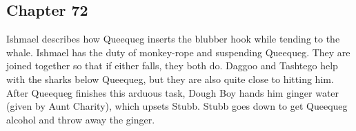 \subsection{Chapter 72}

Ishmael describes how Queequeg inserts the blubber hook while tending to the
whale. Ishmael has the duty of monkey-rope and suspending Queequeg. They are
joined together so that if either falls, they both do. Daggoo and Tashtego help
with the sharks below Queequeg, but they are also quite close to hitting him.
After Queequeg finishes this arduous task, Dough Boy hands him ginger water
(given by Aunt Charity), which upsets Stubb. Stubb goes down to get Queequeg
alcohol and throw away the ginger.
